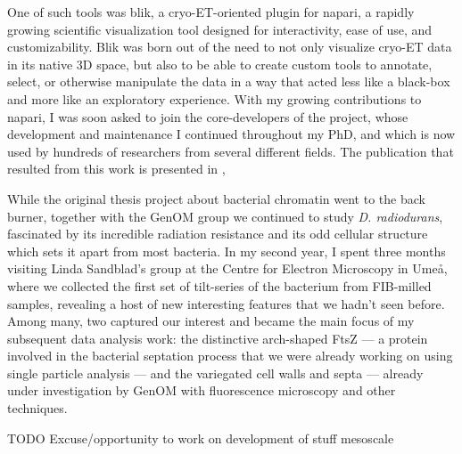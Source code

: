 One of such tools was blik, a cryo-ET-oriented plugin for napari, a rapidly growing scientific visualization tool designed for interactivity, ease of use, and customizability.
Blik was born out of the need to not only visualize cryo-ET data in its native 3D space, but also to be able to create custom tools to annotate, select, or otherwise manipulate the data in a way that acted less like a black-box and more like an exploratory experience.
With my growing contributions to napari, I was soon asked to join the core-developers of the project, whose development and maintenance I continued throughout my PhD, and which is now used by hundreds of researchers from several different fields.
The publication that resulted from this work is presented in ,

While the original thesis project about bacterial chromatin went to the back burner, together with the GenOM group we continued to study \textit{D. radiodurans}, fascinated by its incredible radiation resistance and its odd cellular structure which sets it apart from most bacteria.
In my second year, I spent three months visiting Linda Sandblad's group at the Centre for Electron Microscopy in Umeå, where we collected the first set of tilt-series of the bacterium from FIB-milled samples, revealing a host of new interesting features that we hadn't seen before.
Among many, two captured our interest and became the main focus of my subsequent data analysis work: the distinctive arch-shaped FtsZ --- a protein involved in the bacterial septation process that we were already working on using single particle analysis --- and the variegated cell walls and septa --- already under investigation by GenOM with fluorescence microscopy and other techniques.

TODO Excuse/opportunity to work on development of stuff
mesoscale

